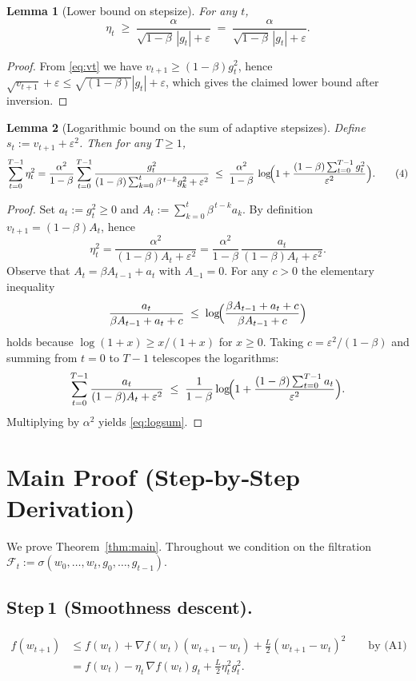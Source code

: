 \documentclass[11pt]{article}
\newtheorem{lemma}{Lemma}
\begin{document}
\begin{lemma}[Lower bound on stepsize]\label{lem:eta}
For any $t$,
\[
\eta_t \;\ge\; \frac{\alpha}{\sqrt{1-\beta}\,|g_t|+\varepsilon}
\;=\; \frac{\alpha}{\sqrt{1-\beta}\,|g_t|+\varepsilon}. \tag{3}
\]
\end{lemma}
\begin{proof}
From \eqref{eq:vt} we have $v_{t+1}\ge (1-\beta)g_t^{2}$, hence
$\sqrt{v_{t+1}}+\varepsilon\le \sqrt{(1-\beta)}|g_t|+\varepsilon$, which gives the claimed lower bound after inversion. \qedhere
\end{proof}

\begin{lemma}[Logarithmic bound on the sum of adaptive stepsizes]\label{lem:logsum}
Define $s_t:=v_{t+1}+\varepsilon^{2}$.  Then for any $T\ge1$,
\[
\sum_{t=0}^{T-1}\eta_t^{2}
= \frac{\alpha^{2}}{1-\beta}\sum_{t=0}^{T-1}
\frac{g_t^{2}}{(1-\beta)\sum_{k=0}^{t}\beta^{\,t-k}g_k^{2}+\varepsilon^{2}}
\;\le\;
\frac{\alpha^{2}}{1-\beta}\,
\log\!\Bigl(1+\frac{(1-\beta)\sum_{t=0}^{T-1}g_t^{2}}{\varepsilon^{2}}\Bigr). \tag{4}
\]
\end{lemma}
\begin{proof}
Set $a_t:=g_t^{2}\ge0$ and $A_t:=\sum_{k=0}^{t}\beta^{\,t-k}a_k$.  By definition $v_{t+1}=(1-\beta)A_t$, hence
\[
\eta_t^{2}= \frac{\alpha^{2}}{(1-\beta)A_t+\varepsilon^{2}}
= \frac{\alpha^{2}}{1-\beta}\,\frac{a_t}{(1-\beta)A_t+\varepsilon^{2}}.
\]
Observe that $A_t=\beta A_{t-1}+a_t$ with $A_{-1}=0$.  For any $c>0$ the elementary inequality
\[
\frac{a_t}{\beta A_{t-1}+a_t+c}\;\le\;
\log\!\Bigl(\frac{\beta A_{t-1}+a_t+c}{\beta A_{t-1}+c}\Bigr)
\]
holds because $\log(1+x)\ge x/(1+x)$ for $x\ge0$.  Taking $c=\varepsilon^{2}/(1-\beta)$ and summing from $t=0$ to $T-1$ telescopes the logarithms:
\[
\sum_{t=0}^{T-1}\frac{a_t}{(1-\beta)A_t+\varepsilon^{2}}
\;\le\;
\frac{1}{1-\beta}\log\!\Bigl(1+\frac{(1-\beta)\sum_{t=0}^{T-1}a_t}{\varepsilon^{2}}\Bigr).
\]
Multiplying by $\alpha^{2}$ yields \eqref{eq:logsum}. \qedhere
\end{proof}

\section*{Main Proof (Step‑by‑Step Derivation)}
We prove Theorem~\ref{thm:main}.  Throughout we condition on the filtration
$\mathcal{F}_t:=\sigma(w_0,\dots,w_t,g_0,\dots,g_{t-1})$.

\subsection*{Step 1 (Smoothness descent).}
\[
\begin{aligned}
f(w_{t+1})
&\le f(w_t)+\nabla f(w_t)(w_{t+1}-w_t)+\frac{L}{2}(w_{t+1}-w_t)^2
\qquad\text{by (A1)}\\
&= f(w_t)-\eta_t\,\nabla f(w_t)g_t+\frac{L}{2}\eta_t^{2}g_t^{2}. \tag{5}
\end{aligned}
\]
\end{document}
